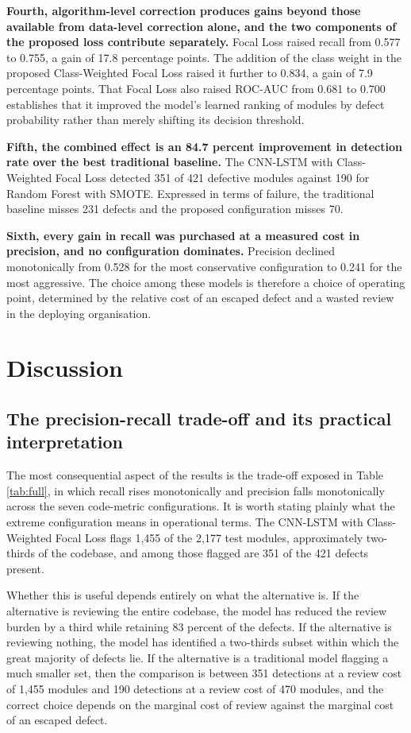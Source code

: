 \documentclass[12pt,a4paper,oneside]{report}
\begin{document}
\textbf{Fourth, algorithm-level correction produces gains beyond those available from data-level correction alone, and the two components of the proposed loss contribute separately.} Focal Loss raised recall from 0.577 to 0.755, a gain of 17.8 percentage points. The addition of the class weight in the proposed Class-Weighted Focal Loss raised it further to 0.834, a gain of 7.9 percentage points. That Focal Loss also raised ROC-AUC from 0.681 to 0.700 establishes that it improved the model's learned ranking of modules by defect probability rather than merely shifting its decision threshold.

\textbf{Fifth, the combined effect is an 84.7 percent improvement in detection rate over the best traditional baseline.} The CNN-LSTM with Class-Weighted Focal Loss detected 351 of 421 defective modules against 190 for Random Forest with SMOTE. Expressed in terms of failure, the traditional baseline misses 231 defects and the proposed configuration misses 70.

\textbf{Sixth, every gain in recall was purchased at a measured cost in precision, and no configuration dominates.} Precision declined monotonically from 0.528 for the most conservative configuration to 0.241 for the most aggressive. The choice among these models is therefore a choice of operating point, determined by the relative cost of an escaped defect and a wasted review in the deploying organisation.

\section{Discussion}

\subsection{The precision-recall trade-off and its practical interpretation}

The most consequential aspect of the results is the trade-off exposed in Table \ref{tab:full}, in which recall rises monotonically and precision falls monotonically across the seven code-metric configurations. It is worth stating plainly what the extreme configuration means in operational terms. The CNN-LSTM with Class-Weighted Focal Loss flags 1,455 of the 2,177 test modules, approximately two-thirds of the codebase, and among those flagged are 351 of the 421 defects present.

Whether this is useful depends entirely on what the alternative is. If the alternative is reviewing the entire codebase, the model has reduced the review burden by a third while retaining 83 percent of the defects. If the alternative is reviewing nothing, the model has identified a two-thirds subset within which the great majority of defects lie. If the alternative is a traditional model flagging a much smaller set, then the comparison is between 351 detections at a review cost of 1,455 modules and 190 detections at a review cost of 470 modules, and the correct choice depends on the marginal cost of review against the marginal cost of an escaped defect.
\end{document}

